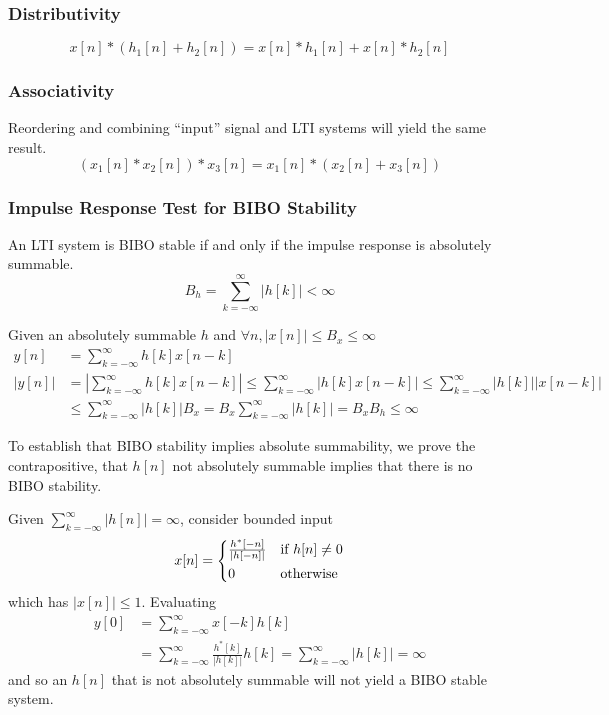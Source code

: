 \documentclass{article}
\begin{document}
\subsubsection{Distributivity}
\begin{equation}
    x[n]*(h_1[n]+h_2[n]) = x[n]*h_1[n]+x[n]*h_2[n]
\end{equation}

\subsubsection{Associativity}
Reordering and combining ``input'' signal and LTI systems will yield the same result.
\begin{equation}
    (x_1[n]*x_2[n])*x_3[n]=x_1[n]*(x_2[n]+x_3[n])
\end{equation}

\subsubsection{Impulse Response Test for BIBO Stability}
An LTI system is BIBO stable if and only if the impulse response is absolutely summable.
\begin{equation}
    B_h=\sum_{k=-\infty}^\infty |h[k]|<\infty
\end{equation}

Given an absolutely summable $h$ and $\forall n, |x[n]|\le B_x\le\infty$
\begin{align*}
	y[n] &= \sum_{k=-\infty}^\infty h[k]x[n-k]\\
	|y[n]| &= \left|\sum_{k=-\infty}^\infty h[k]x[n-k]\right|
	    \le \sum_{k=-\infty}^\infty |h[k]x[n-k]|
	    \le \sum_{k=-\infty}^\infty |h[k]||x[n-k]|\\
	    &\le \sum_{k=-\infty}^\infty |h[k]|B_x
	    = B_x\sum_{k=-\infty}^\infty |h[k]| = B_xB_h \le \infty
\end{align*}

To establish that BIBO stability implies absolute summability, we prove the contrapositive, that $h[n]$ not absolutely summable implies that there is no BIBO stability.

Given $\sum_{k=-\infty}^\infty |h[n]|=\infty$, consider bounded input
\[
    x[n] = \begin{cases*}
        \frac{h^*[-n]}{|h[-n]|} & if $h[n]\ne0$\\
        0 & otherwise
    \end{cases*}
\]
which has $|x[n]| \le 1$. Evaluating
\begin{align*}
	y[0] &= \sum_{k=-\infty}^\infty x[-k]h[k]\\
	     &= \sum_{k=-\infty}^\infty \frac{h^*[k]}{|h[k]|}h[k]
	      = \sum_{k=-\infty}^\infty |h[k]| = \infty
\end{align*}
and so an $h[n]$ that is not absolutely summable will not yield a BIBO stable system.
\end{document}
